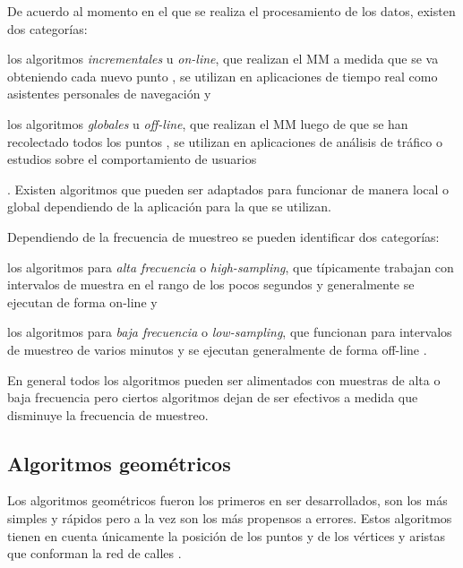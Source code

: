 De acuerdo al momento en el que se realiza el procesamiento de los datos, existen dos categorías: \begin{enumerate*}[1)] \item los algoritmos \emph{incrementales} u \emph{on-line}, que realizan el MM a medida que se va obteniendo cada nuevo punto \cite{thiagarajan2009vtrack,thiagarajan2011accurate,greenfeld2002matching,quddus2003general,quddus2006high}, se utilizan en aplicaciones de tiempo real como asistentes personales de navegación y \item los algoritmos \emph{globales} u \emph{off-line}, que realizan el MM luego de que se han recolectado todos los puntos \cite{lou2009map,yuan2010interactive}, se utilizan en aplicaciones de análisis de tráfico o estudios sobre el comportamiento de usuarios\end{enumerate*}. Existen algoritmos que pueden ser adaptados para funcionar de manera local o global dependiendo de la aplicación para la que se utilizan.

Dependiendo de la frecuencia de muestreo se pueden identificar dos categorías: \begin{enumerate*}[1)] \item los algoritmos para \emph{alta frecuencia} o \emph{high-sampling}, que típicamente trabajan con intervalos de muestra en el rango de los pocos segundos y generalmente se ejecutan de forma on-line \cite{greenfeld2002matching,quddus2003general,quddus2006high} y \item los algoritmos para \emph{baja frecuencia} o \emph{low-sampling},  que funcionan para intervalos de muestreo de varios minutos y se ejecutan generalmente de forma off-line \cite{lou2009map,yuan2010interactive}. \end{enumerate*} En general todos los algoritmos pueden ser alimentados con muestras de alta o baja frecuencia pero ciertos algoritmos dejan de ser efectivos a medida que disminuye la frecuencia de muestreo.

\subsection{Algoritmos geométricos}

Los algoritmos geométricos fueron los primeros en ser desarrollados, son los más simples y rápidos pero a la vez son los más propensos a errores. Estos algoritmos tienen en cuenta únicamente la posición de los puntos y de los vértices y aristas que conforman la red de calles \cite{quddus2007current}.

